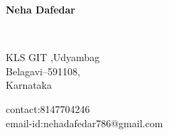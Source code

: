 \documentclass{article}
\begin{document}
\begin{figure}
\begin{center}
\textbf{Neha Dafedar}
\end{center}
\hrulefill\\
\begin{minipage}[t]{0.5\textwidth}
KLS GIT ,Udyambag\\
Belagavi--591108,\\
Karnataka\\
\end{minipage}
\begin{minipage}[t]{0.5\textwidth}
\raggedleft
contact:8147704246\\
email-id:nehadafedar786@gmail.com\\
\end{minipage}

\end{figure}
\end{document}
